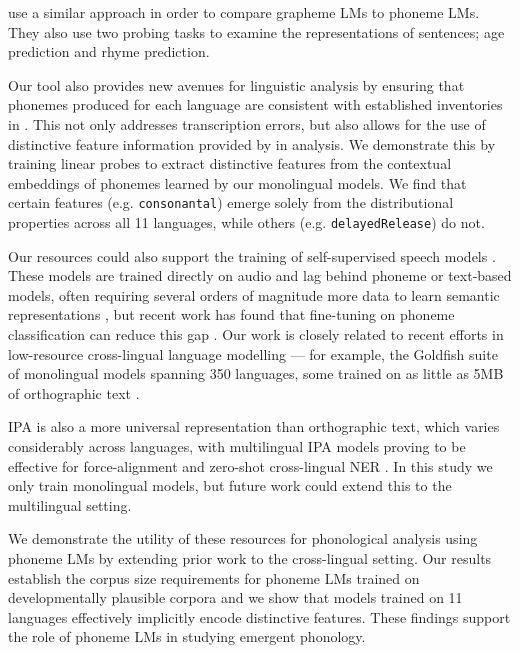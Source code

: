 \citet{bunzeck-etal-2025-small} use a similar approach in order to compare grapheme LMs to phoneme LMs. They also use two probing tasks to examine the representations of sentences; age prediction and rhyme prediction.







Our \gpp tool also provides new avenues for linguistic analysis by ensuring that phonemes produced for each language are consistent with established inventories in \phoible. This not only addresses transcription errors, but also allows for the use of distinctive feature information provided by \phoible in analysis. We demonstrate this by training linear probes to extract distinctive features from the contextual embeddings of phonemes learned by our monolingual models. We find that certain features (e.g. \texttt{consonantal}) emerge solely from the distributional properties across all 11 languages, while others (e.g. \texttt{delayedRelease}) do not. 

Our resources could also support the training of self-supervised speech models \citep[e.g.][]{hsu2021hubert}. These models are trained directly on audio and lag behind phoneme or text-based models, often requiring several orders of magnitude more data to learn semantic representations \citep{cuervo2024scaling}, but recent work has found that fine-tuning on phoneme classification can reduce this gap \citep{feng-2023-language-universal-phonetic, poli2024improving}. Our work is closely related to recent efforts in low-resource cross-lingual language modelling --- for example, the Goldfish suite of monolingual models spanning 350 languages, some trained on as little as 5MB of orthographic text \citep{chang2024goldfish}.

IPA is also a more universal representation than orthographic text, which varies considerably across languages, with multilingual IPA models proving to be effective for force-alignment \citep{zhu-etal-2024-taste} and zero-shot cross-lingual NER \citep{sohn2024zero}. In this study we only train monolingual models, but future work could extend this to the multilingual setting.


We demonstrate the utility of these resources for phonological analysis using phoneme LMs by extending prior work to the cross-lingual setting. Our results establish the corpus size requirements for phoneme LMs trained on developmentally plausible corpora and we show that models trained on 11 languages effectively implicitly encode distinctive features. These findings support the role of phoneme LMs in studying emergent phonology. 

